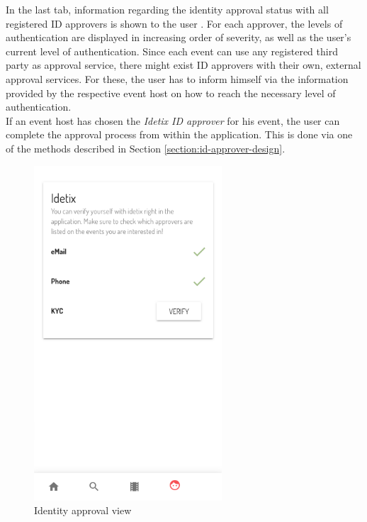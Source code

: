 In the last tab, information regarding the identity approval status with all registered ID approvers is shown to the user . For each approver, the levels of authentication are displayed in increasing order of severity, as well as the user's current level of authentication. Since each event can use any registered third party as approval service, there might exist ID approvers with their own, external approval services. For these, the user has to inform himself via the information provided by the respective event host on how to reach the necessary level of authentication. \\
If an event host has chosen the \textit{Idetix ID approver} for his event, the user can complete the approval process from within the application. This is done via one of the methods described in Section \ref{section:id-approver-design}. 
\begin{figure}[H]
    \centering
    \includegraphics[width=7cm]{images/ide_1.png}
    \caption{Identity approval view}
    \label{img:identity}
\end{figure}
